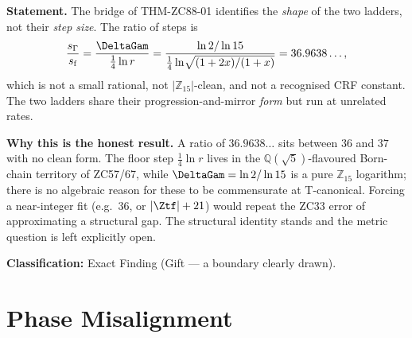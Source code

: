 \documentclass[12pt, a4paper]{article}
\begin{document}
\begin{giftbox}[title={FIND-ZC88-01: Structural, Not Metric ---
  $\DeltaGam/(\tfrac14\ln r)$ is Not Clean ($R_0$, Exact --- Gift)}]

\textbf{Statement.}
The bridge of THM-ZC88-01 identifies the \emph{shape} of the two ladders,
not their \emph{step size}. The ratio of steps is
\begin{equation}
  \frac{s_\Gamma}{s_{\rm f}}
  =\frac{\DeltaGam}{\tfrac14\ln r}
  =\frac{\ln 2/\ln 15}{\tfrac14\ln\!\sqrt{(1+2x)/(1+x)}}
  = 36.9638\ldots,
  \label{eq:find-main-zc88}
\end{equation}
which is not a small rational, not $|\mathbb{Z}_{15}|$-clean, and not a
recognised CRF constant. The two ladders share their progression-and-mirror
\emph{form} but run at unrelated rates.

\textbf{Why this is the honest result.}
A ratio of $36.9638\ldots$ sits between $36$ and $37$ with no clean form.
The floor step $\tfrac14\ln r$ lives in the $\mathbb{Q}(\sqrt5)$-flavoured
Born-chain territory of ZC57/67, while $\DeltaGam=\ln2/\ln15$ is a pure
$\mathbb{Z}_{15}$ logarithm; there is no algebraic reason for these to be
commensurate at T-canonical. Forcing a near-integer fit (e.g.\ $36$, or
$|\Ztf|+21$) would repeat the ZC33 error of approximating a structural gap.
The structural identity stands and the metric question is left explicitly open.

\textbf{Classification:} Exact Finding (Gift --- a boundary clearly drawn).
\end{giftbox}

\section{Phase Misalignment}
\label{sec:pm-zc88}
\end{document}
